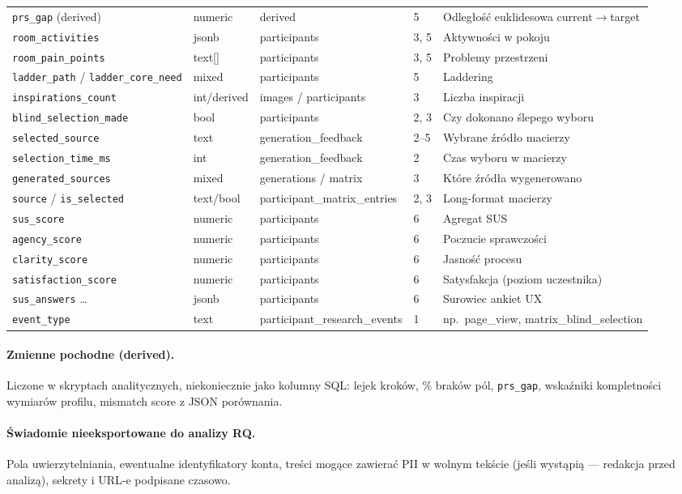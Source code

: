 \begin{longtable}{@{}p{3.6cm}p{1.8cm}p{2.4cm}p{1.4cm}p{3.2cm}@{}}
  \texttt{prs\_gap} (derived) & numeric & derived & 5 & Odległość euklidesowa current$\rightarrow$target \\
  \addlinespace
  \texttt{room\_activities} & jsonb & participants & 3, 5 & Aktywności w pokoju \\
  \texttt{room\_pain\_points} & text[] & participants & 3, 5 & Problemy przestrzeni \\
  \texttt{ladder\_path} / \texttt{ladder\_core\_need} & mixed & participants & 5 & Laddering \\
  \texttt{inspirations\_count} & int/derived & images / participants & 3 & Liczba inspiracji \\
  \addlinespace
  \texttt{blind\_selection\_made} & bool & participants & 2, 3 & Czy dokonano ślepego wyboru \\
  \texttt{selected\_source} & text & generation\_feedback & 2--5 & Wybrane źródło macierzy \\
  \texttt{selection\_time\_ms} & int & generation\_feedback & 2 & Czas wyboru w macierzy \\
  \texttt{generated\_sources} & mixed & generations / matrix & 3 & Które źródła wygenerowano \\
  \texttt{source} / \texttt{is\_selected} & text/bool & participant\_matrix\_entries & 2, 3 & Long-format macierzy \\
  \addlinespace
  \texttt{sus\_score} & numeric & participants & 6 & Agregat SUS \\
  \texttt{agency\_score} & numeric & participants & 6 & Poczucie sprawczości \\
  \texttt{clarity\_score} & numeric & participants & 6 & Jasność procesu \\
  \texttt{satisfaction\_score} & numeric & participants & 6 & Satysfakcja (poziom uczestnika) \\
  \texttt{sus\_answers} \ldots & jsonb & participants & 6 & Surowiec ankiet UX \\
  \addlinespace
  \texttt{event\_type} & text & participant\_research\_events & 1 & np.\ page\_view, matrix\_blind\_selection \\
\end{longtable}

\paragraph{Zmienne pochodne (derived).}
Liczone w skryptach analitycznych, niekoniecznie jako kolumny SQL: lejek kroków, \% braków pól, \texttt{prs\_gap}, wskaźniki kompletności wymiarów profilu, mismatch score z JSON porównania.

\paragraph{Świadomie nieeksportowane do analizy RQ.}
Pola uwierzytelniania, ewentualne identyfikatory konta, treści mogące zawierać PII w wolnym tekście (jeśli wystąpią --- redakcja przed analizą), sekrety i URL-e podpisane czasowo.
